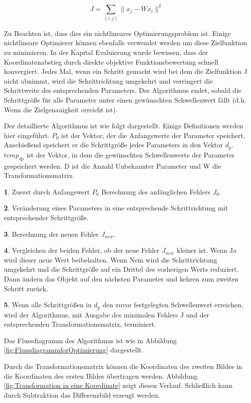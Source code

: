 \begin{equation}
   J = \sum_{(i,j)}\lVert x_j - Wx_i \rVert ^2
\end{equation}

Zu Beachten ist, dass dies ein nichtlineares Optimierungsproblem ist. Einige nichtlineare Optimierer können ebenfalls verwendet werden um diese Zielfunktion zu minimieren. In der Kapital Evaluierung wurde bewissen, dass der Koordinatenabstieg durch direkte objektive Funktionsbewertung schnell konvergiert. Jedes Mal, wenn ein Schritt gemacht wird bei dem die Zielfunktion J nicht abnimmt, wird die Schrittrichtung umgekehrt und verringert die Schrittweite des entsprechenden Parameters. Der Algorithmus endet, sobald die Schrittgröße für alle Parameter unter einen gewünschten Schwellenwert fällt (d.h. Wenn die Zielgenauigkeit erreicht ist). 

Der detaillierte Algorithmus ist wie folgt dargestellt. Einige Definitionen werden hier eingeführt. $P_0$ ist der Vektor, der die Anfangswerte der Parameter speichert. Anschießend speichert er die Schrittgröße jedes Parameters in den Vektor $d_p$. $temp_{dp}$ ist der Vektor, in dem die gewünschten Schwellenwerte der Parameter gespeichert werden. D ist die Anzahl Unbekannter Parameter und W die Transformationsmatrix.

\textbf{1}. Zuerst durch Anfangswert $P_0$ Berechnung des anfänglichen Fehlers $J_0$.

\textbf{2}. Veränderung eines Parameters in eine entsprechende Schrittrichtung mit entsprechender Schrittgröße.

\textbf{3}. Berechnung der neuen Fehler $J_{new}$.

\textbf{4}. Vergleichen der beiden Fehler, ob der neue Fehler $J_{new}$ kleiner ist. Wenn Ja wird dieser neue Wert beibehalten. Wenn Nein wird die Schrittrichtung umgekehrt und die Schrittgröße auf ein Drittel des vorherigen Werts reduziert. Dann ändern das Objekt auf den nächsten Parameter und kehren zum zweiten Schritt zurück.

\textbf{5}. Wenn alle Schrittgrößen in $d_p$ den zuvor festgelegten Schwellenwert erreichen, wird der Algorithmus, mit Ausgabe des minimalen Fehlers J und der entsprechenden Transformationsmatrix, terminiert.

Das Flussdiagramm des Algorithmus ist wie in Abbildung \ref{fig:FlussdiagrammforOptimierung} dargestellt.

Durch die Transformationsmatrix können die Koordinaten des zweiten Bildes in die Koordinaten des ersten Bildes übertragen werden. Abbildung \ref{fig:Transformation in eine Koordinate} zeigt diesen Verlauf. Schließlich kann durch Subtraktion das Differenzbild erzeugt werden.

